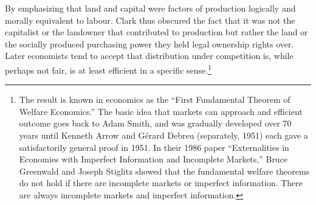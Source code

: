 
By emphasizing that land and capital were factors of production logically and morally equivalent to labour. Clark thus obscured the fact that it was not the capitalist or the landowner that contributed to production but rather  the land or the socially produced purchasing power they held legal ownership rights over. Later economists tend to accept that distribution under competition is, while perhaps not fair, is at least efficient in a specific sense.\footnote{The result is known  in economics as the ``First Fundamental Theorem of Welfare Economics.'' The basic idea that markets can approach and efficient outcome goes back to Adam Smith, and was gradually developed  over 70 years until Kenneth Arrow and Gérard Debreu (separately, 1951) each gave a satisfactorily general proof in 1951. In their 1986 paper ``Externalities in Economies with Imperfect Information and Incomplete Markets,''
Bruce Greenwald and Joseph Stiglitz showed that the fundamental welfare theorems do not hold if there are incomplete markets or imperfect information. There are always incomplete markets and  imperfect information.}%




